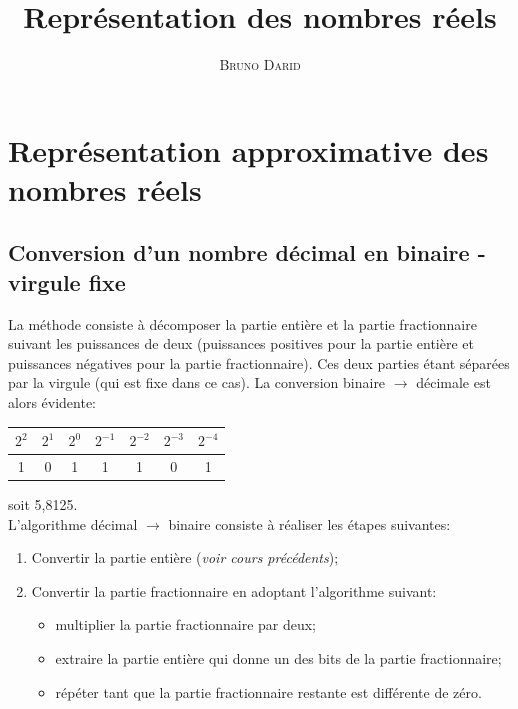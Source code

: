 \documentclass[11pt, french]{article}
\title{Représentation des nombres réels}
\author{\textsc{Bruno Darid}}
\providecommand{\tightlist}{%
      \setlength{\itemsep}{0pt}\setlength{\parskip}{0pt}}
\begin{document}
  	\renewcommand{\contentsname}{\textsc{Plan}}    
 	\maketitle
 	\tableofcontents
    

    
    \hypertarget{repruxe9sentation-approximative-des-nombres-ruxe9els}{%
\section{Représentation approximative des nombres
réels}\label{repruxe9sentation-approximative-des-nombres-ruxe9els}}

    \hypertarget{conversion-dun-nombre-duxe9cimal-en-binaire---virgule-fixe}{%
\subsection{Conversion d'un nombre décimal en binaire - virgule
fixe}\label{conversion-dun-nombre-duxe9cimal-en-binaire---virgule-fixe}}

La méthode consiste à décomposer la partie entière et la partie
fractionnaire suivant les puissances de deux (puissances positives pour
la partie entière et puissances négatives pour la partie fractionnaire).
Ces deux parties étant séparées par la virgule (qui est fixe dans ce
cas). La conversion binaire \(\rightarrow\) décimale est alors évidente:

\begin{table}[h!]
\centering
\begin{tabular}{|c|c|c|c|c|c|c|}
\hline
$2^2$ & $2^1$ & $2^0$ & $2^{-1}$ & $2^{-2}$ & $2^{-3}$ & $2^{-4}$ \\ \hline
1     & 0     & 1     & 1        & 1        & 0        & 1        \\ \hline
\end{tabular}
\end{table}

soit 5,8125.\\
L'algorithme décimal \(\rightarrow\) binaire consiste à réaliser les étapes suivantes:

\begin{enumerate}
\def\labelenumi{\arabic{enumi})}
\tightlist
\item
  Convertir la partie entière (\emph{voir cours précédents});
\item
  Convertir la partie fractionnaire en adoptant l'algorithme suivant:
\begin{itemize}
\tightlist
\item
  multiplier la partie fractionnaire par deux;
\item
  extraire la partie entière qui donne un des bits de la partie
  fractionnaire;
\item
  répéter tant que la partie fractionnaire restante est différente de
  zéro.
\end{itemize}
\end{enumerate}
\end{document}
